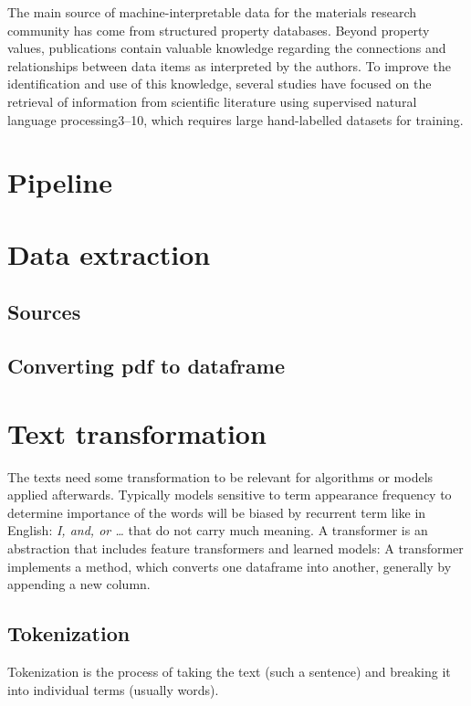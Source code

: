
The main source of machine-interpretable data for the materials research community has come from structured property databases. Beyond property values, publications contain valuable knowledge regarding the connections and relationships between data items as interpreted by the authors. To improve the identification and use of this knowledge, several studies have focused on the retrieval of information from scientific literature using supervised natural language processing3–10, which requires large hand-labelled datasets for training.

\section{Pipeline}
 
\section{Data extraction}

\subsection{Sources}
\subsection{Converting pdf to dataframe}

\section{Text transformation}
The texts need some transformation to be relevant for algorithms or models applied afterwards. Typically models sensitive to term appearance frequency to determine importance of the words will be biased by recurrent term like in English: \textit{I, and, or \ldots} that do not carry much meaning.
\newline
A transformer is an abstraction that includes feature transformers and learned models: \ie A transformer implements a method, which converts one dataframe into another, generally by appending a new column.  

\subsection{Tokenization}
Tokenization is the process of taking the text (such a sentence) and breaking it into individual terms (usually words).

